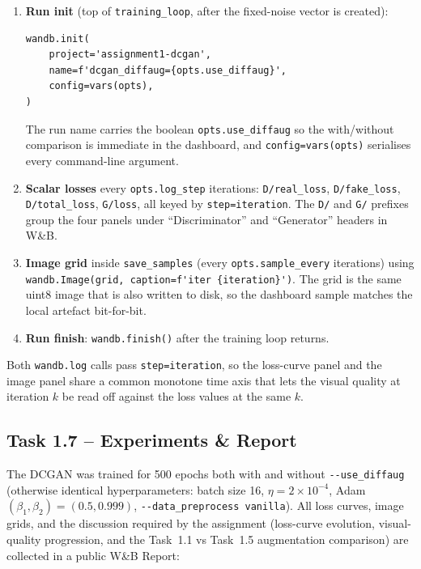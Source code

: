 \documentclass[11pt,a4paper]{article}
\begin{document}
\begin{enumerate}[leftmargin=1.5em]
    \item \textbf{Run init} (top of \verb|training_loop|, after the
          fixed-noise vector is created):
\begin{lstlisting}
wandb.init(
    project='assignment1-dcgan',
    name=f'dcgan_diffaug={opts.use_diffaug}',
    config=vars(opts),
)
\end{lstlisting}
          The run name carries the boolean \verb|opts.use_diffaug| so
          the with/without comparison is immediate in the dashboard,
          and \verb|config=vars(opts)| serialises every command-line
          argument.

    \item \textbf{Scalar losses} every \verb|opts.log_step| iterations:
          \verb|D/real_loss|, \verb|D/fake_loss|, \verb|D/total_loss|,
          \verb|G/loss|, all keyed by \verb|step=iteration|. The
          \verb|D/| and \verb|G/| prefixes group the four panels under
          ``Discriminator'' and ``Generator'' headers in W\&B.

    \item \textbf{Image grid} inside \verb|save_samples| (every
          \verb|opts.sample_every| iterations) using
          \verb|wandb.Image(grid, caption=f'iter {iteration}')|. The
          grid is the same uint8 image that is also written to disk, so
          the dashboard sample matches the local artefact bit-for-bit.

    \item \textbf{Run finish}: \verb|wandb.finish()| after the training
          loop returns.
\end{enumerate}

Both \verb|wandb.log| calls pass \verb|step=iteration|, so the
loss-curve panel and the image panel share a common monotone time axis
that lets the visual quality at iteration $k$ be read off against the
loss values at the same $k$.

\subsection*{Task 1.7 -- Experiments \& Report}

The DCGAN was trained for 500 epochs both with and without
\verb|--use_diffaug| (otherwise identical hyperparameters: batch size
16, $\eta=2\!\times\!10^{-4}$, Adam $(\beta_1,\beta_2)=(0.5,0.999)$,
\verb|--data_preprocess vanilla|). All loss curves, image grids, and
the discussion required by the assignment (loss-curve evolution,
visual-quality progression, and the Task~1.1 vs Task~1.5 augmentation
comparison) are collected in a public W\&B Report:
\end{document}
